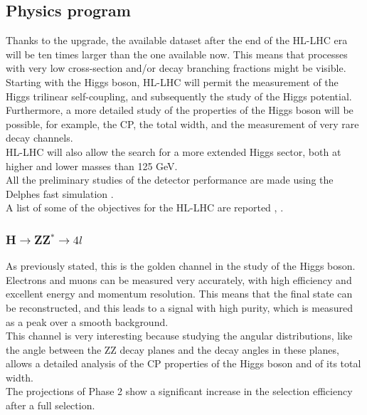 \subsection{Physics program}
Thanks to the upgrade, the available dataset after the end of the HL-LHC era will be ten times larger than the one available now. This means that processes with very low cross-section and/or decay branching fractions might be visible.\\
Starting with the Higgs boson, HL-LHC will permit the measurement of the Higgs trilinear self-coupling, and subsequently the study of the Higgs potential. Furthermore, a more detailed study of the properties of the Higgs boson will be possible, for example, the CP, the total width, and the measurement of very rare decay channels.\\
HL-LHC will also allow the search for a more extended Higgs sector, both at higher and lower masses than 125 GeV.\\
All the preliminary studies of the detector performance are made using the Delphes fast simulation \cite{delphes}.\\
A list of some of the objectives for the HL-LHC are reported \cite{HL-LHC_Higgs}, \cite{phase2_tdr}.
\subsubsection{H$\longrightarrow $ZZ$^* \longrightarrow 4 l$}
As previously stated, this is the golden channel in the study of the Higgs boson. Electrons and muons can be measured very accurately, with high efficiency and excellent energy and momentum resolution. This means that the final state can be reconstructed, and this leads to a signal with high purity, which is measured as a peak over a smooth background.\\
This channel is very interesting because studying the angular distributions, like the angle between the ZZ decay planes and the decay angles in these planes, allows a detailed analysis of the CP properties of the Higgs boson and of its total width.\\
The projections of Phase 2 show a significant increase in the selection efficiency after a full selection. 

